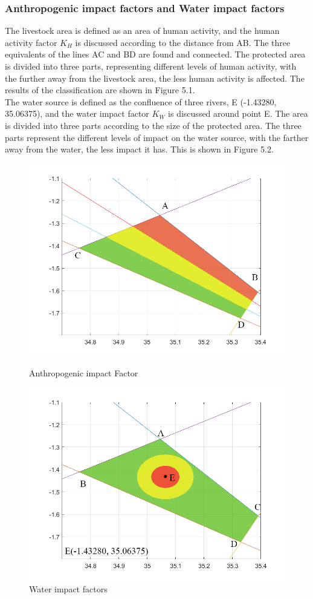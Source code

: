 \documentclass{mcmthesis}
\numberwithin{figure}{section}
\numberwithin{table}{section}
\numberwithin{equation}{section}
\begin{document}
\subsubsection{Anthropogenic impact factors and Water impact factors}
The livestock area is defined as an area of human activity, and the human activity factor $K_H$ is discussed according to the distance from AB. The three equivalents of the lines AC and BD are found and connected. The protected area is divided into three parts, representing different levels of human activity, with the further away from the livestock area, the less human activity is affected. The results of the classification are shown in Figure 5.1.
\\
The water source is defined as the confluence of three rivers, E (-1.43280, 35.06375), and the water impact factor $K_W$ is discussed around point E. The area is divided into three parts according to the size of the protected area. The three parts represent the different levels of impact on the water source, with the farther away from the water, the less impact it has. This is shown in Figure 5.2.
 \begin{figure}[htp]
	\centering
	\begin{minipage}[t]{0.48\linewidth}
		\centering
		\includegraphics[width=0.7\linewidth]{"figures/F5.1Human Factor"}
		\caption{Anthropogenic impact Factor }
		\label{F 5.1}
	\end{minipage}\hfill
	\begin{minipage}[t]{0.48\linewidth}
		\centering
		\includegraphics[width=0.7\linewidth]{"figures/F5.2water factor"}
		\caption{Water impact factors}
		\label{F 5.2}
	\end{minipage}\hfill
\end{figure}
\end{document}
